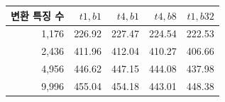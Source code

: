 \begin{tabular}{rrrrr}
\toprule
변환 특징 수 & $t1,b1$ & $t4,b1$ & $t4,b8$ & $t1,b32$ \\
\midrule
1,176 & 226.92 & 227.47 & 224.54 & 222.53 \\
2,436 & 411.96 & 412.04 & 410.27 & 406.66 \\
4,956 & 446.62 & 447.15 & 444.08 & 437.98 \\
9,996 & 455.04 & 454.18 & 443.01 & 448.38 \\
\bottomrule
\end{tabular}
